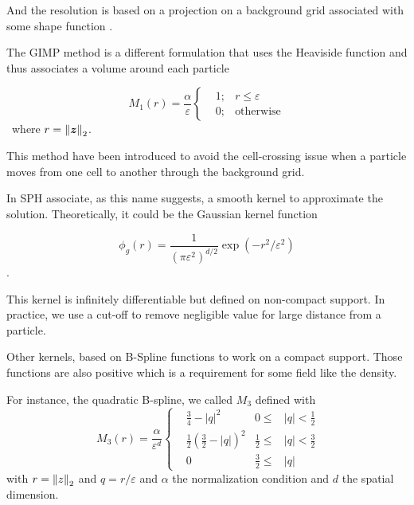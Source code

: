 And the resolution is based on a projection on a background grid associated with some shape function \cite{sulsky_particle_1994}.

The GIMP method is a different formulation that uses the Heaviside function \cite{bardenhagen_generalized_2004} and thus associates a volume around each particle

\begin{equation*}
	M_1(r) = \frac{\alpha}{\varepsilon}\left\{\begin{aligned}
		 & 1; & r \leq \varepsilon \\
		 & 0; & \text{otherwise}
	\end{aligned}
	\right.
\end{equation*}~where $r = \left\lVert \bm z \right\rVert_2$.

This method have been introduced to avoid the cell-crossing issue when a particle moves from one cell to another through the background grid.

In SPH associate, as this name suggests, a smooth kernel to approximate the solution. Theoretically, it could be the Gaussian kernel function

\begin{equation*}
	\phi_g(r) = \frac{1}{{(\pi \varepsilon^2)}^{d/2}} \exp(-r^2/\varepsilon^2)
\end{equation*}.

This kernel is infinitely differentiable but defined on non-compact support. In practice, we use a cut-off to remove negligible value for large distance from a particle.

Other kernels, based on B-Spline functions to work on a compact support. Those functions are also positive which is a requirement for some field like the density.

For instance, the quadratic B-spline, we called $M_3$ defined with
\begin{equation}~\label{quadratic_kernel}
	M_3(r) = \frac{\alpha}{\varepsilon^d}\left\{ \begin{aligned}
		 & \frac{3}{4} - |q|^2                            & 0 \leq           & |q| < \frac{1}{2} \\
		 & \frac{1}{2} {\left(\frac{3}{2} - |q|\right)}^2 & \frac{1}{2} \leq & |q| < \frac{3}{2} \\
		 & 0                                              & \frac{3}{2} \leq & |q|
	\end{aligned}
	\right.
\end{equation}with $r = \left\lVert z \right\rVert_2 $ and $q = r / \varepsilon$ and $\alpha$ the normalization condition and $d$ the spatial dimension.

